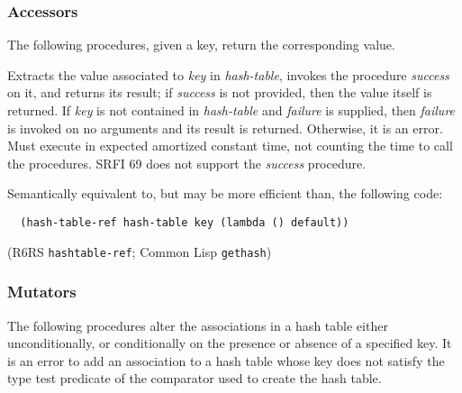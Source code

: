 \subsubsection{Accessors}\label{Accessors}

The following procedures, given a key, return the corresponding value.

\begin{entry}{%
  }

  Extracts the value associated to \emph{key} in \emph{hash-table},
  invokes the procedure \emph{success} on it, and returns its result;
  if \emph{success} is not provided, then the value itself is
  returned. If \emph{key} is not contained in \emph{hash-table} and
  \emph{failure} is supplied, then \emph{failure} is invoked on no
  arguments and its result is returned. Otherwise, it is an
  error. Must execute in expected amortized constant time, not
  counting the time to call the procedures.  SRFI 69 does not support
  the \emph{success} procedure.
\end{entry}

\begin{entry}{%
  }

  Semantically equivalent to, but may be more efficient than, the
  following code:

\begin{verbatim}
  (hash-table-ref hash-table key (lambda () default))
\end{verbatim}

(R6RS \texttt{hashtable-ref}; Common Lisp \texttt{gethash})
\end{entry}

\subsubsection{Mutators}\label{Mutators}

The following procedures alter the associations in a hash table either
unconditionally, or conditionally on the presence or absence of a
specified key. It is an error to add an association to a hash table
whose key does not satisfy the type test predicate of the comparator
used to create the hash table.

